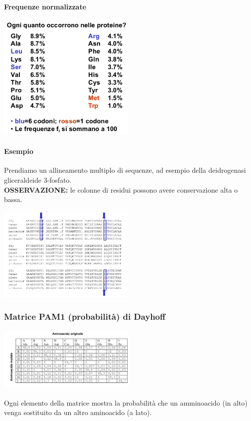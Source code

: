 \documentclass{article}
\begin{document}
\paragraph{Frequenze normalizzate}
\begin{center}
    \includegraphics[width=0.5\textwidth]{figures/norm.png}\\
\end{center}
\paragraph{Esempio}
Prendiamo un allineamento multiplo di sequenze,
ad esempio della deidrogenasi gliceraldeide 3-fosfato.\\
\textbf{OSSERVAZIONE:}
le colonne di residui possono avere conservazione alta o bassa.
\begin{center}
    \includegraphics[width=0.5\textwidth]{figures/es3.png}\\
\end{center}
\subsubsection{Matrice PAM1 (probabilità) di Dayhoff}
\begin{center}
    \includegraphics[width=0.5\textwidth]{figures/pam1.png}\\
\end{center}
Ogni elemento della matrice mostra la probabilità che un
amminoacido (in alto) venga sostituito da un altro aminoacido
(a lato).
\end{document}
